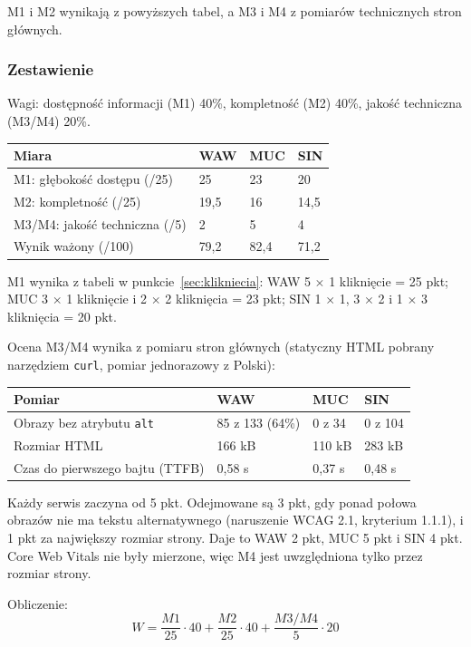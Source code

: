 \documentclass[11pt,a4paper]{article}
\begin{document}
M1 i M2 wynikają z powyższych tabel, a M3 i M4 z pomiarów technicznych stron głównych.

\subsubsection*{Zestawienie}

Wagi: dostępność informacji (M1) 40\%, kompletność (M2) 40\%, jakość techniczna (M3/M4) 20\%.

{\small
\begin{tabularx}{\textwidth}{@{}YC{2.2cm}C{2.2cm}C{2.2cm}@{}}
\toprule
Miara & WAW & MUC & SIN \\
\midrule
M1: głębokość dostępu (/25) & 25 & 23 & 20 \\
M2: kompletność (/25) & 19,5 & 16 & 14,5 \\
M3/M4: jakość techniczna (/5) & 2 & 5 & 4 \\
\midrule
Wynik ważony (/100) & 79,2 & 82,4 & 71,2 \\
\bottomrule
\end{tabularx}
}

M1 wynika z tabeli w punkcie~\ref{sec:klikniecia}: WAW 5 $\times$ 1 kliknięcie = 25 pkt; MUC 3 $\times$ 1 kliknięcie i 2 $\times$ 2 kliknięcia = 23 pkt; SIN 1 $\times$ 1, 3 $\times$ 2 i 1 $\times$ 3 kliknięcia = 20 pkt.

Ocena M3/M4 wynika z pomiaru stron głównych (statyczny HTML pobrany narzędziem \texttt{curl}, pomiar jednorazowy z Polski):

{\small
\begin{tabularx}{\textwidth}{@{}YC{2.6cm}C{2.6cm}C{2.6cm}@{}}
\toprule
Pomiar & WAW & MUC & SIN \\
\midrule
Obrazy bez atrybutu \texttt{alt} & 85 z 133 (64\%) & 0 z 34 & 0 z 104 \\
Rozmiar HTML & 166 kB & 110 kB & 283 kB \\
Czas do pierwszego bajtu (TTFB) & 0,58 s & 0,37 s & 0,48 s \\
\bottomrule
\end{tabularx}
}

Każdy serwis zaczyna od 5 pkt. Odejmowane są 3 pkt, gdy ponad połowa obrazów nie ma tekstu alternatywnego (naruszenie WCAG 2.1, kryterium 1.1.1), i 1 pkt za największy rozmiar strony. Daje to WAW 2 pkt, MUC 5 pkt i SIN 4 pkt. Core Web Vitals nie były mierzone, więc M4 jest uwzględniona tylko przez rozmiar strony.

Obliczenie:
\[
  W = \frac{M1}{25}\cdot 40 + \frac{M2}{25}\cdot 40 + \frac{M3/M4}{5}\cdot 20
\]
\end{document}
